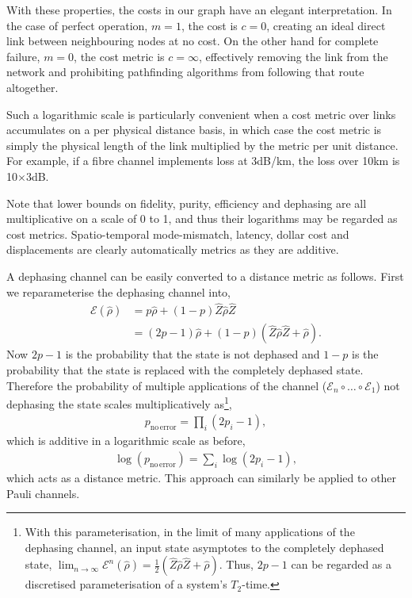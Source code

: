 With these properties, the costs in our graph have an elegant interpretation. In the case of perfect operation, \mbox{$m=1$}, the cost is \mbox{$c=0$}, creating an ideal direct link between neighbouring nodes at no cost. On the other hand for complete failure, \mbox{$m=0$}, the cost metric is \mbox{$c=\infty$}, effectively removing the link from the network and prohibiting pathfinding algorithms from following that route altogether.

Such a logarithmic scale is particularly convenient when a cost metric over links accumulates on a per physical distance basis, in which case the cost metric is simply the physical length of the link multiplied by the metric per unit distance. For example, if a fibre channel implements loss at 3dB/km, the loss over 10km is 10$\times$3dB.

Note that lower bounds on fidelity, purity, efficiency and dephasing are all multiplicative on a scale of 0 to 1, and thus their logarithms may be regarded as cost metrics. Spatio-temporal mode-mismatch, latency, dollar cost and displacements are clearly automatically metrics as they are additive.

A dephasing channel can be easily converted to a distance metric as follows. First we reparameterise the dephasing channel into,
\begin{align}
\mathcal{E}(\hat\rho) &= p\hat\rho + (1-p)\hat{Z}\hat\rho\hat{Z}\nonumber\\
&= (2p-1)\hat\rho + (1-p)(\hat{Z}\hat\rho\hat{Z} + \hat\rho).	
\end{align}
Now \mbox{$2p-1$} is the probability that the state is not dephased and \mbox{$1-p$} is the probability that the state is replaced with the completely dephased state. Therefore the probability of multiple applications of the channel (\mbox{$\mathcal{E}_n\circ\dots\circ\mathcal{E}_1$}) not dephasing the state scales multiplicatively as\footnote{With this parameterisation, in the limit of many applications of the dephasing channel, an input state asymptotes to the completely dephased state, \mbox{$\lim_{n\to\infty} \mathcal{E}^n(\hat\rho) = \frac{1}{2}(\hat{Z}\hat\rho\hat{Z}+\hat\rho)$}. Thus, \mbox{$2p-1$} can be regarded as a discretised parameterisation of a system's $T_2$-time.},
\begin{align}
p_\mathrm{no\, error} = \prod_{i}(2p_i-1),
\end{align}
which is additive in a logarithmic scale as before,
\begin{align}
\log(p_\mathrm{no\, error}) = \sum_i \log(2p_i-1),
\end{align}
which acts as a distance metric. This approach can similarly be applied to other Pauli channels.

